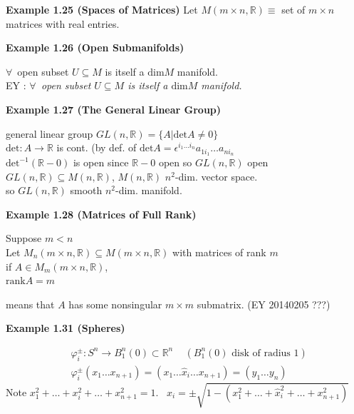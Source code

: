 \documentclass[11pt]{amsart}
\theoremstyle{definition}
\begin{document}
\textbf{Example 1.25 (Spaces of Matrices) } Let $M(m\times n,\mathbb{R}) \equiv $ set of $m\times n$ matrices with real entries.

\textbf{Example 1.26 (Open Submanifolds)}

$\forall \, $ open subset $U \subseteq M$ is itself a $\text{dim}{M}$ manifold. \\
EY : \emph{ $\forall \, $ open subset $U \subseteq M$ is itself a $\text{dim}{M}$ manifold. }


\textbf{Example 1.27 (The General Linear Group) }

general linear group $GL(n,\mathbb{R}) = \lbrace A | \text{det}{A} \neq 0 \rbrace$ \\
\quad $\text{det}:A \to \mathbb{R}$ is cont. (by def. of $\text{det}{A} = \epsilon^{ i_1 \dots i_n}a_{1 i_1} \dots a_{n i_n}$ \\
\quad $\text{det}^{-1}{ ( \mathbb{R} - 0 )}$ is open since $\mathbb{R}-0$ open so $GL(n,\mathbb{R})$ open \\
\quad $GL(n,\mathbb{R}) \subseteq M(n,\mathbb{R})$, $M(n,\mathbb{R})$ $n^2$-dim. vector space. \\
\quad \quad so $GL(n,\mathbb{R})$ smooth $n^2$-dim. manifold.

\textbf{Example 1.28 (Matrices of Full Rank)}

Suppose $m <n$ \\

Let $M_n(m\times n, \mathbb{R}) \subseteq M(m\times n, \mathbb{R})$ with matrices of rank $m$ \\
if $A \in M_m(m\times n, \mathbb{R})$, \\
\quad $\text{rank}{A}=m$

means that $A$ has some nonsingular $m \times m$ submatrix.  (EY 20140205 ???)




\textbf{Example 1.31 (Spheres)}

\[
\begin{aligned}
  & \varphi_i^{\pm} : S^n \to B_1^n(0) \subset \mathbb{R}^n \quad \, (B_1^n(0) \text{ disk of radius $1$}) \\
  & \varphi_i^{\pm}(x_1 \dots x_{n+1}) = (x_1 \dots \widehat{x}_i \dots x_{n+1} )= (y_1 \dots y_n)
\end{aligned}
\]
Note $x_1^2 + \dots + x_i^2 + \dots + x_{n+1}^2 = 1$.  \quad \, $x_i = \pm \sqrt{ 1 - (x_1^2 + \dots + \widehat{x}_i^2 + \dots + x_{n+1}^2 ) }$
\end{document}
